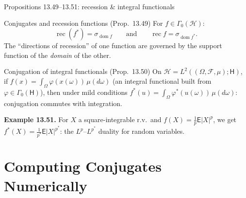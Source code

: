 \documentclass[aspectratio=169,10pt]{beamer}
\newcommand{\Hil}{\mathcal{H}}
\newcommand{\dom}{\operatorname{dom}}
\newcommand{\GammaZero}{\Gamma_0(\Hil)}
\newcommand{\conj}[1]{#1^{*}}
\begin{document}
\begin{frame}{Propositions 13.49--13.51: recession \& integral functionals}
  \begin{block}{Conjugates and recession functions (Prop.\ 13.49)}
    For $f\in\GammaZero$:
    \[
      \operatorname{rec}(\conj f) = \sigma_{\dom f}
      \qquad\text{and}\qquad
      \operatorname{rec} f = \sigma_{\dom \conj f}.
    \]
    The ``directions of recession'' of one function are governed by the
    support function of the \emph{domain} of the other.
  \end{block}
  \begin{block}{Conjugation of integral functionals (Prop.\ 13.50)}
    On $\Hil=L^2((\Omega,\mathcal F,\mu);\mathsf H)$, if
    $f(x)=\int_\Omega \varphi(x(\omega))\,\mu(d\omega)$ (an integral
    functional built from $\varphi\in\Gamma_0(\mathsf H)$), then under mild
    conditions $\conj f(u) = \int_\Omega \conj\varphi(u(\omega))\,\mu(d\omega)$:
    conjugation commutes with integration.
  \end{block}
  \textbf{Example 13.51.} For $X$ a square-integrable r.v.\ and
  $f(X)=\tfrac1p\mathsf E|X|^p$, we get $\conj f(X) = \tfrac1{p^{*}}
  \mathsf E|X|^{p^{*}}$: the $L^p$--$L^{p^{*}}$ duality for random variables.
\end{frame}

\section{Computing Conjugates Numerically}
\end{document}
